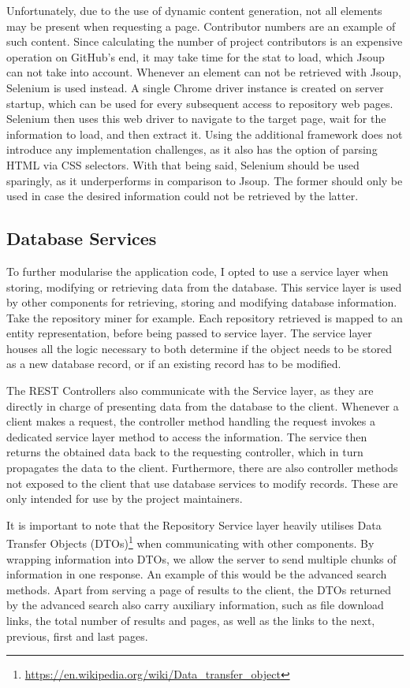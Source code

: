 Unfortunately, due to the use of dynamic content generation, not all elements may be present when requesting a page.
Contributor numbers are an example of such content.
Since calculating the number of project contributors is an expensive operation on GitHub's end, it may take time for the stat to load, which Jsoup can not take into account.
Whenever an element can not be retrieved with Jsoup, Selenium is used instead.
A single Chrome driver instance is created on server startup, which can be used for every subsequent access to repository web pages.
Selenium then uses this web driver to navigate to the target page, wait for the information to load, and then extract it.
Using the additional framework does not introduce any implementation challenges, as it also has the option of parsing HTML via CSS selectors.
With that being said, Selenium should be used sparingly, as it underperforms in comparison to Jsoup.
The former should only be used in case the desired information could not be retrieved by the latter.

\subsection{Database Services}

To further modularise the application code, I opted to use a service layer when storing, modifying or retrieving data from the database.
This service layer is used by other components for retrieving, storing and modifying database information.
Take the repository miner for example.
Each repository retrieved is mapped to an entity representation, before being passed to service layer.
The service layer houses all the logic necessary to both determine if the object needs to be stored as a new database record, or if an existing record has to be modified.

The REST Controllers also communicate with the Service layer, as they are directly in charge of presenting data from the database to the client.
Whenever a client makes a request, the controller method handling the request invokes a dedicated service layer method to access the information.
The service then returns the obtained data back to the requesting controller, which in turn propagates the data to the client.
Furthermore, there are also controller methods not exposed to the client that use database services to modify records.
These are only intended for use by the project maintainers.

It is important to note that the Repository Service layer heavily utilises Data Transfer Objects (DTOs)\footnote{\url{https://en.wikipedia.org/wiki/Data_transfer_object}} when communicating with other components.
By wrapping information into DTOs, we allow the server to send multiple chunks of information in one response.
An example of this would be the advanced search methods.
Apart from serving a page of results to the client, the DTOs returned by the advanced search also carry auxiliary information, such as file download links, the total number of results and pages, as well as the links to the next, previous, first and last pages.

